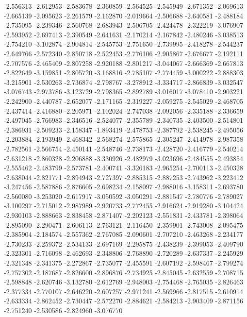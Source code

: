 -2.556313
-2.612953
-2.583678
-2.360859
-2.564525
-2.545949
-2.671352
-2.069613
-2.665139
-2.095623
-2.261579
-2.162870
-2.019664
-2.506688
-2.640581
-2.488184
-2.735095
-2.239346
-2.560768
-2.683943
-2.506705
-2.424478
-2.322219
-3.076907
-2.593952
-2.697413
-2.390549
-2.641631
-2.170214
-2.167842
-2.480246
-3.038513
-2.754210
-3.102874
-2.904814
-2.545753
-2.751650
-2.739995
-2.418278
-2.544237
-2.649766
-2.572340
-2.850718
-2.522453
-2.776106
-2.905867
-2.676677
-2.192111
-2.707576
-2.465409
-2.807258
-2.920188
-2.801217
-3.044067
-2.666369
-2.667813
-2.822649
-3.159851
-2.805720
-3.168816
-2.785107
-2.774459
-3.000222
-2.888303
-3.215901
-2.530263
-2.736874
-2.798767
-3.278912
-3.334717
-2.866839
-3.032547
-3.076743
-2.973786
-3.123729
-2.798365
-2.892789
-3.016017
-3.078410
-2.903221
-2.242900
-2.440787
-2.652077
-2.171165
-2.319227
-2.059275
-2.545029
-2.468705
-2.437414
-2.416880
-2.205971
-2.102024
-2.747038
-2.092056
-2.335188
-2.336659
-2.497045
-2.766983
-2.346516
-2.524077
-2.355789
-2.340735
-2.403500
-2.514801
-2.386931
-2.509233
-2.158347
-1.893419
-2.478753
-2.387792
-2.538245
-2.495056
-2.203884
-2.193949
-2.468342
-2.568274
-2.575865
-2.305247
-2.414978
-2.987358
-2.782561
-2.566754
-2.450141
-2.548746
-2.738173
-2.428720
-2.416779
-2.540214
-2.631218
-2.860328
-2.206888
-3.330926
-2.482979
-3.023696
-2.484555
-2.493854
-2.555462
-2.483799
-2.573781
-2.400741
-3.326183
-2.965254
-2.700113
-2.450328
-2.638044
-2.821771
-2.894943
-2.727397
-2.885315
-2.887253
-2.743962
-3.223412
-3.247456
-2.587886
-2.876605
-2.698234
-2.158097
-2.988016
-3.158311
-2.693780
-2.560080
-3.253020
-2.617917
-3.050592
-3.050291
-2.881547
-2.780776
-2.789027
-3.100297
-2.715012
-2.987989
-2.920733
-2.772455
-2.916624
-2.919280
-3.104424
-2.930103
-2.888663
-2.838458
-2.871407
-2.202123
-2.551831
-2.433781
-2.398064
-2.895090
-2.290471
-2.606113
-2.763121
-2.116450
-2.359901
-2.743008
-2.095475
-2.385904
-2.184574
-2.557362
-2.767085
-2.090601
-2.707210
-2.463268
-2.234177
-2.730233
-2.259372
-2.534133
-2.697169
-2.295875
-2.438239
-2.399053
-2.409790
-2.323301
-2.716098
-2.462693
-2.348806
-2.768890
-2.720289
-2.637337
-2.245929
-2.321348
-2.341375
-2.272867
-2.735077
-2.455591
-2.607192
-2.598467
-2.799274
-2.757302
-2.187687
-2.826600
-2.896876
-2.734925
-2.845045
-2.632559
-2.708715
-2.598848
-2.620746
-3.132780
-2.612769
-2.948003
-2.754468
-2.765035
-2.826463
-2.377334
-2.770107
-2.646220
-2.607257
-2.971241
-2.569966
-2.817515
-2.610914
-2.633334
-2.862452
-2.730447
-2.572270
-2.884621
-2.584213
-2.903409
-2.871156
-2.751240
-2.530586
-2.824960
-3.076770
